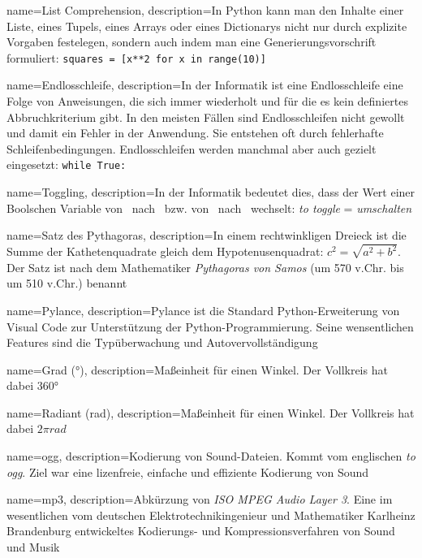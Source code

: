 {
	name={List Comprehension},
	description={In Python kann man den Inhalte einer Liste, eines Tupels, eines Arrays oder eines Dictionarys nicht nur durch explizite Vorgaben festelegen, sondern auch indem man eine Generierungsvorschrift formuliert: \texttt{squares = [x**2 for x in range(10)]}} 
}

{
	name={Endlosschleife},
	description={In der Informatik ist eine Endlosschleife eine Folge von Anweisungen, die sich immer wiederholt und für die es kein definiertes Abbruchkriterium gibt. In den meisten Fällen sind Endlosschleifen nicht gewollt und damit ein Fehler in der Anwendung. Sie entstehen oft durch fehlerhafte Schleifenbedingungen. Endlosschleifen werden manchmal aber auch gezielt eingesetzt: \texttt{while True:}} 
}

{
	name={Toggling},
	description={In der Informatik bedeutet dies, dass der Wert einer Boolschen Variable von \true\ nach \false\ bzw. von \false\ nach \true\ wechselt: \emph{to toggle} = \emph{umschalten}} 
}

{
	name={Satz des Pythagoras},
	description={In einem rechtwinkligen Dreieck ist die Summe der Kathetenquadrate gleich dem Hypotenusenquadrat: $c^2 = \sqrt{a^2 + b^2}$. Der Satz ist nach dem Mathematiker \emph{Pythagoras von Samos} (um 570 v.Chr. bis um 510 v.Chr.) benannt} 
}

{
	name={Pylance},
	description={Pylance ist die Standard Python-Erweiterung von Visual Code zur Unterstützung der Python-Programmierung. Seine wensentlichen Features sind die Typüberwachung und Autovervollständigung} 
}

{
	name={Grad (°)},
	description={Maßeinheit für einen Winkel. Der Vollkreis hat dabei $360°$} 
}

{
	name={Radiant (rad)},
	description={Maßeinheit für einen Winkel. Der Vollkreis hat dabei $2\pi rad$} 
}

{
	name={ogg},
	description={Kodierung von Sound-Dateien. Kommt vom englischen \emph{to ogg}. Ziel war eine lizenfreie, einfache und effiziente Kodierung von Sound} 
}

{
	name={mp3},
	description={Abkürzung von \emph{ISO MPEG Audio Layer 3}. Eine im wesentlichen vom deutschen Elektrotechnikingenieur und Mathematiker Karlheinz Brandenburg entwickeltes Kodierungs- und Kompressionsverfahren von Sound und Musik} 
}

